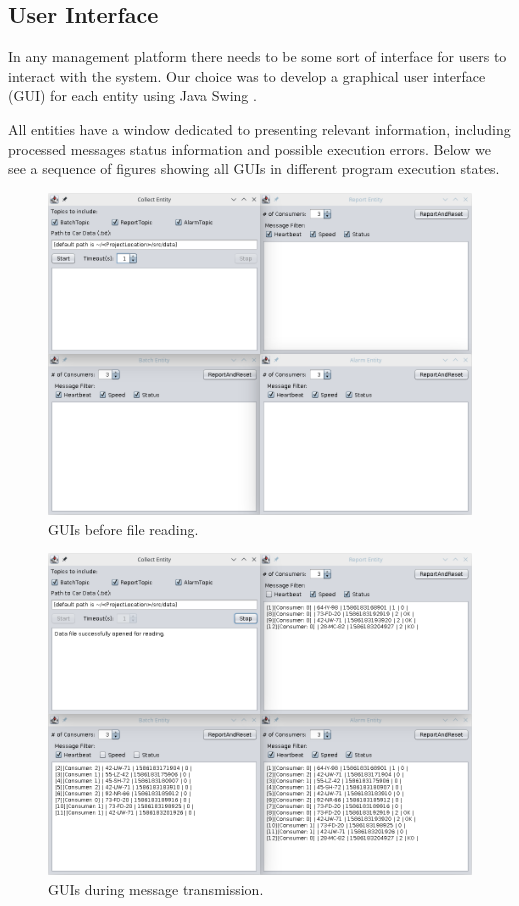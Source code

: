 \documentclass[12pt]{article}
\begin{document}
\subsection{User Interface} %

In any management platform there needs to be some sort of interface for users to interact with the system.
Our choice was to develop a graphical user interface (GUI) for each entity using Java Swing \cite{swing}.

All entities have a window dedicated to presenting relevant information, including processed messages status information and possible execution errors.
Below we see a sequence of figures showing all GUIs in different program execution states.

\begin{figure}[H]
  \centering
  \begin{minipage}{\textwidth}
    \centering
    \includegraphics[width=.75\linewidth]{img/GUI_1.png}
  \end{minipage}%
  \caption{GUIs before file reading.}
  \label{GUI_1}
\end{figure} 

\begin{figure}[H]
  \centering
  \begin{minipage}{\textwidth}
    \centering
    \includegraphics[width=.75\linewidth]{img/GUI_2.png}
  \end{minipage}%
  \caption{GUIs during message transmission.}
  \label{GUI_2}
\end{figure} 
\end{document}
